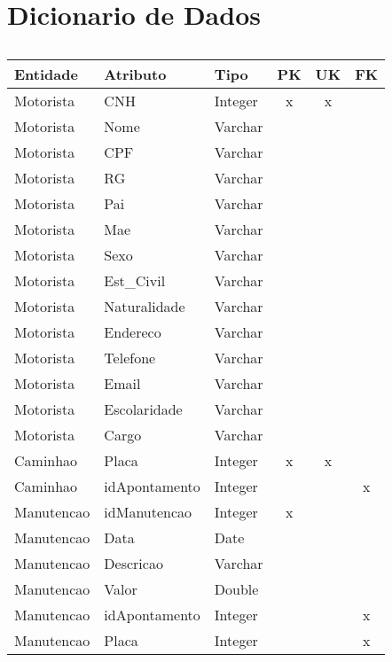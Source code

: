 
\section{Dicionario de Dados} %
\label{sec:dicionario_de_dados}


\begin{table}[htbp]
\caption{}
\begin{tabular}{|l|l|l|c|c|c|}
\hline
\textbf{Entidade} & \textbf{Atributo} & \textbf{Tipo} & \textbf{PK} & \textbf{UK} & \textbf{FK} \\ \hline
Motorista & CNH & Integer & x & x &  \\ \hline
Motorista & Nome & Varchar &  &  &  \\ \hline
Motorista & CPF & Varchar &  &  &  \\ \hline
Motorista & RG & Varchar &  &  &  \\ \hline
Motorista & Pai & Varchar &  &  &  \\ \hline
Motorista & Mae & Varchar &  &  &  \\ \hline
Motorista & Sexo & Varchar &  &  &  \\ \hline
Motorista & Est\_Civil & Varchar &  &  &  \\ \hline
Motorista & Naturalidade & Varchar &  &  &  \\ \hline
Motorista & Endereco & Varchar &  &  &  \\ \hline
Motorista & Telefone & Varchar &  &  &  \\ \hline
Motorista & Email & Varchar &  &  &  \\ \hline
Motorista & Escolaridade & Varchar &  &  &  \\ \hline
Motorista & Cargo & Varchar &  &  &  \\ \hline
Caminhao & Placa & Integer & x & x &  \\ \hline
Caminhao & idApontamento & Integer &  &  & x \\ \hline
Manutencao & idManutencao & Integer & x &  &  \\ \hline
Manutencao & Data & Date &  &  &  \\ \hline
Manutencao & Descricao & Varchar &  &  &  \\ \hline
Manutencao & Valor & Double &  &  &  \\ \hline
Manutencao & idApontamento & Integer &  &  & x \\ \hline
Manutencao & Placa & Integer &  &  & x \\ \hline

\end{tabular}
\end{table}
